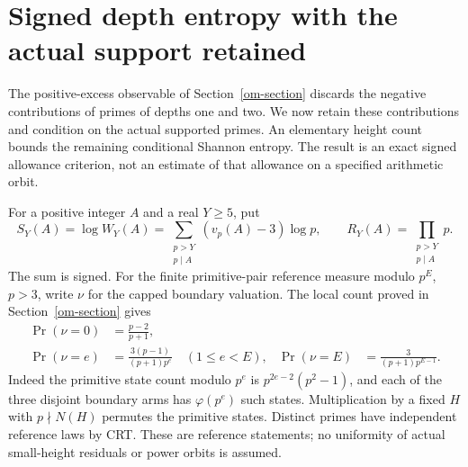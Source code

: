 \section{Signed depth entropy with the actual support retained}
\label{se-section}
The positive-excess observable of Section~\ref{om-section} discards the
negative contributions of primes of depths one and two. We now retain
these contributions and condition on the actual supported primes. An
elementary height count bounds the remaining conditional Shannon entropy.
The result is an exact signed allowance criterion, not an estimate of
that allowance on a specified arithmetic orbit.

For a positive integer $A$ and a real $Y\ge5$, put
\[
 S_Y(A)=\log W_Y(A)=\sum_{\substack{p>Y\\p\mid A}}
          (v_p(A)-3)\log p,
 \qquad R_Y(A)=\prod_{\substack{p>Y\\p\mid A}}p.
\]
The sum is signed. For the finite primitive-pair reference measure
modulo $p^E$, $p>3$, write $\nu$ for the capped boundary valuation.
The local count proved in Section~\ref{om-section} gives
\begin{align*}
 \Pr(\nu=0)&=\frac{p-2}{p+1},\\
 \Pr(\nu=e)&=\frac{3(p-1)}{(p+1)p^e}\quad(1\le e<E),&
 \Pr(\nu=E)&=\frac{3}{(p+1)p^{E-1}}.
\end{align*}
Indeed the primitive state count modulo $p^e$ is
$p^{2e-2}(p^2-1)$, and each of the three disjoint boundary arms has
$\varphi(p^e)$ such states. Multiplication by a fixed $H$ with
$p\nmid N(H)$ permutes the primitive states. Distinct primes have
independent reference laws by CRT. These are reference statements;
no uniformity of actual small-height residuals or power orbits is assumed.

